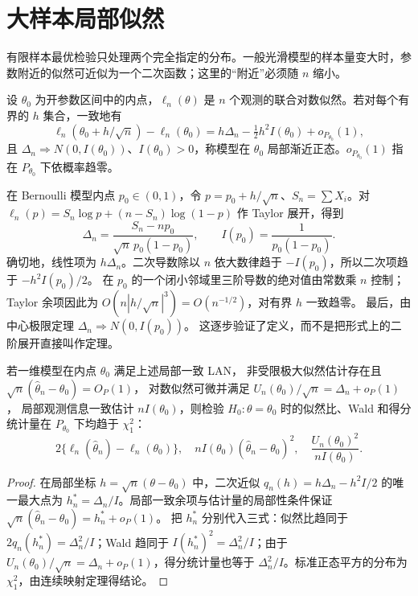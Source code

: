 \section{大样本局部似然}

有限样本最优检验只处理两个完全指定的分布。一般光滑模型的样本量变大时，参数附近的似然可近似为一个二次函数；这里的“附近”必须随 \(n\) 缩小。

\begin{definition}[局部渐近正态性]
设 \(\theta_0\) 为开参数区间中的内点，\(\ell_n(\theta)\) 是 \(n\) 个观测的联合对数似然。若对每个有界的 \(h\) 集合，一致地有
\[
\ell_n(\theta_0+h/\sqrt n)-\ell_n(\theta_0)
=h\Delta_n-\tfrac12h^2I(\theta_0)+o_{P_{\theta_0}}(1),
\]
且 \(\Delta_n\Rightarrow N(0,I(\theta_0))\)、\(I(\theta_0)>0\)，称模型在 \(\theta_0\) 局部渐近正态。\(o_{P_{\theta_0}}(1)\) 指在 \(P_{\theta_0}\) 下依概率趋零。
\end{definition}

在 Bernoulli 模型内点 \(p_0\in(0,1)\)，令
\(p=p_0+h/\sqrt n\)、\(S_n=\sum X_i\)。对
\(\ell_n(p)=S_n\log p+(n-S_n)\log(1-p)\) 作 Taylor 展开，得到
\[
\Delta_n=\frac{S_n-np_0}{\sqrt n\,p_0(1-p_0)},\qquad
I(p_0)=\frac1{p_0(1-p_0)}.
\]
确切地，线性项为 \(h\Delta_n\)。二次导数除以 \(n\) 依大数律趋于
\(-I(p_0)\)，所以二次项趋于 \(-h^2I(p_0)/2\)。
在 \(p_0\) 的一个闭小邻域里三阶导数的绝对值由常数乘 \(n\) 控制；
Taylor 余项因此为
\(O(n|h/\sqrt n|^3)=O(n^{-1/2})\)，对有界 \(h\) 一致趋零。
最后，由中心极限定理 \(\Delta_n\Rightarrow N(0,I(p_0))\)。
这逐步验证了定义，而不是把形式上的二阶展开直接叫作定理。

\begin{theorem}[一维正则模型中的三种渐近检验]
若一维模型在内点 \(\theta_0\) 满足上述局部一致 LAN，
非受限极大似然估计存在且 \(\sqrt n(\widehat\theta_n-\theta_0)=O_P(1)\)，
对数似然可微并满足 \(U_n(\theta_0)/\sqrt n=\Delta_n+o_P(1)\)，
局部观测信息一致估计 \(nI(\theta_0)\)，则检验 \(H_0:\theta=\theta_0\) 时的似然比、Wald 和得分统计量在 \(P_{\theta_0}\) 下均趋于 \(\chi^2_1\)：
\[
2\{\ell_n(\widehat\theta_n)-\ell_n(\theta_0)\},\quad
nI(\theta_0)(\widehat\theta_n-\theta_0)^2,\quad
\frac{U_n(\theta_0)^2}{nI(\theta_0)}.
\]
\end{theorem}
\begin{proof}
在局部坐标 \(h=\sqrt n(\theta-\theta_0)\) 中，二次近似
\(q_n(h)=h\Delta_n-h^2I/2\) 的唯一最大点为
\(h_n^*=\Delta_n/I\)。局部一致余项与估计量的局部性条件保证
\(\sqrt n(\widehat\theta_n-\theta_0)=h_n^*+o_P(1)\)。
把 \(h_n^*\) 分别代入三式：似然比趋同于
\(2q_n(h_n^*)=\Delta_n^2/I\)；Wald 趋同于
\(I(h_n^*)^2=\Delta_n^2/I\)；由于
\(U_n(\theta_0)/\sqrt n=\Delta_n+o_P(1)\)，得分统计量也等于
\(\Delta_n^2/I\)。标准正态平方的分布为 \(\chi^2_1\)，由连续映射定理得结论。
\end{proof}


